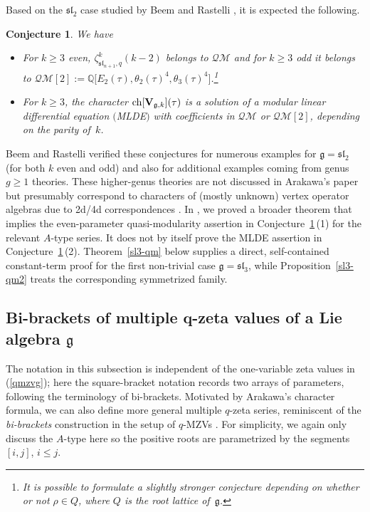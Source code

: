 \documentclass[10pt,a4paper]{amsart}
\numberwithin{equation}{section}
\newtheorem{Conjecture}[Theorem]{Conjecture}
\theoremstyle{definition}
\begin{document}
Based on the $\mathfrak{sl}_2$ case studied by Beem and Rastelli \cite{Beem}, it is expected the following.

\begin{Conjecture} \label{MLDE} We have
\begin{itemize}\itemsep=0pt
\item[$(1)$] For $k \geq 3$ even, $\zeta_{\mathfrak{sl}_{n+1},q}^k(k-2)$ belongs to $\mathcal{QM}$ and for $k \geq 3$ odd it belongs to $\mathcal{QM}[2]:=\mathbb{Q}\bigl[E_2(\tau), \theta_2(\tau)^4,\theta_3(\tau)^4\bigr]$.\footnote{It is possible to formulate a slightly stronger conjecture depending on whether or not $\rho \in Q$, where $Q$ is the root lattice of~$\mathfrak{g}$.}
\item[$(2)$]For $k \geq 3$, the character ${\rm ch}[\mathbf{V}_{\mathfrak{g},k}](\tau)$ is a solution of a modular linear differential equation $($MLDE$)$ with coefficients in $\mathcal{QM}$ or $\mathcal{QM}[2]$, depending on the parity of~$k$.
\end{itemize}
\end{Conjecture}
Beem and Rastelli verified these conjectures for numerous examples for $\mathfrak{g}=\mathfrak{sl}_2$ (for both $k$ even and odd) and also for additional examples coming from
genus $g \geq 1$ theories. These higher-genus theories are not discussed in Arakawa's paper but presumably correspond to characters of (mostly unknown) vertex operator algebras due to 2d/4d correspondences \cite{BR}. In \cite{BVM}, we proved a broader theorem that implies the even-parameter quasi-modularity assertion in Conjecture~\ref{MLDE}\,(1) for the relevant $A$-type series. It does not by itself prove the MLDE assertion in Conjecture~\ref{MLDE}\,(2). Theorem~\ref{sl3-qm} below supplies a direct, self-contained constant-term proof for the first non-trivial case $\mathfrak{g}=\mathfrak{sl}_3$, while Proposition~\ref{sl3-qm2} treats the corresponding symmetrized family.

\subsection[Bi-brackets of multiple q-zeta values of a Lie algebra g]{Bi-brackets of multiple $\boldsymbol{q}$-zeta values of a Lie algebra $\boldsymbol{\mathfrak{g}}$}\label{section3.4}

The notation in this subsection is independent of the one-variable zeta values in (\ref{qmzvg}); here the square-bracket notation records two arrays of parameters, following the terminology of bi-brackets.
Motivated by Arakawa's character formula, we can also define more general multiple $q$-zeta series, reminiscent of the {\em bi-brackets} construction in the setup of $q$-MZVs \cite{BK2,BK1,BK3}. For simplicity, we again only discuss the $A$-type here so the positive roots are parametrized by the segments $[i,j]$, $i \leq j$.
\end{document}
